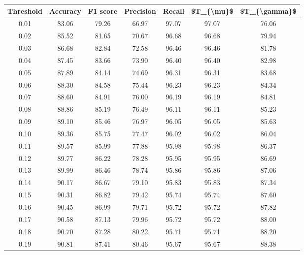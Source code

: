 \begin{tabular}{|c|c|c|c|c|c|c|}
\hline
 Threshold &  Accuracy &  F1 score &  Precision &  Recall &  \$T\_\{\textbackslash mu\}\$ &  \$T\_\{\textbackslash gamma\}\$ \\
\hline
      0.01 &     83.06 &     79.26 &      66.97 &   97.07 &      97.07 &         76.06 \\
      0.02 &     85.52 &     81.65 &      70.67 &   96.68 &      96.68 &         79.94 \\
      0.03 &     86.68 &     82.84 &      72.58 &   96.46 &      96.46 &         81.78 \\
      0.04 &     87.45 &     83.66 &      73.90 &   96.40 &      96.40 &         82.98 \\
      0.05 &     87.89 &     84.14 &      74.69 &   96.31 &      96.31 &         83.68 \\
      0.06 &     88.30 &     84.58 &      75.44 &   96.23 &      96.23 &         84.34 \\
      0.07 &     88.60 &     84.91 &      76.00 &   96.19 &      96.19 &         84.81 \\
      0.08 &     88.86 &     85.19 &      76.49 &   96.11 &      96.11 &         85.23 \\
      0.09 &     89.10 &     85.46 &      76.97 &   96.05 &      96.05 &         85.63 \\
      0.10 &     89.36 &     85.75 &      77.47 &   96.02 &      96.02 &         86.04 \\
      0.11 &     89.57 &     85.99 &      77.88 &   95.98 &      95.98 &         86.37 \\
      0.12 &     89.77 &     86.22 &      78.28 &   95.95 &      95.95 &         86.69 \\
      0.13 &     89.99 &     86.46 &      78.74 &   95.86 &      95.86 &         87.06 \\
      0.14 &     90.17 &     86.67 &      79.10 &   95.83 &      95.83 &         87.34 \\
      0.15 &     90.31 &     86.82 &      79.42 &   95.74 &      95.74 &         87.60 \\
      0.16 &     90.45 &     86.99 &      79.71 &   95.72 &      95.72 &         87.82 \\
      0.17 &     90.58 &     87.13 &      79.96 &   95.72 &      95.72 &         88.00 \\
      0.18 &     90.70 &     87.28 &      80.22 &   95.71 &      95.71 &         88.20 \\
      0.19 &     90.81 &     87.41 &      80.46 &   95.67 &      95.67 &         88.38 \\

\end{tabular}
